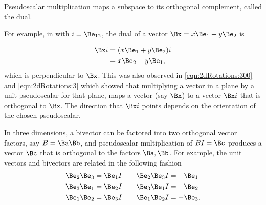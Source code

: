 %
%
Pseudoscalar multiplication maps a subspace to its orthogonal complement, called the dual.


For example, in  with \( i = \Be_{12} \), the dual of a vector \( \Bx = x \Be_1 + y \Be_2 \) is

\begin{equation}\label{eqn:dual:n}
\begin{aligned}
\Bx i
&= (x \Be_1 + y \Be_2) i  \\
&= x \Be_2 - y \Be_1,
\end{aligned}
\end{equation}
which is perpendicular to \( \Bx \).
This was also observed in
\cref{eqn:2dRotations:300} and \cref{eqn:2dRotations:3} which showed that multiplying a vector in a plane by a unit pseudoscalar for that plane, maps a vector (say \( \Bx \)) to a vector \( \Bx i \) that is orthogonal to \( \Bx \).  The direction that \( \Bx i \) points depends on the orientation of the chosen pseudoscalar.
%
%

In three dimensions, a bivector can be factored into two orthogonal vector factors, say \( B = \Ba \Bb \), and
pseudoscalar multiplication of \( B I = \Bc \) produces a vector \( \Bc \) that is orthogonal to the factors \( \Ba, \Bb \).
For example, the unit vectors and bivectors are related in the following fashion
\begin{equation}\label{eqn:dual:1580}
\begin{aligned}
\Be_2 \Be_3 &= \Be_1 I \qquad \Be_2 \Be_3 I = -\Be_1 \\
\Be_3 \Be_1 &= \Be_2 I \qquad \Be_3 \Be_1 I = -\Be_2 \\
\Be_1 \Be_2 &= \Be_3 I \qquad \Be_1 \Be_2 I = -\Be_3.
\end{aligned}
\end{equation}

